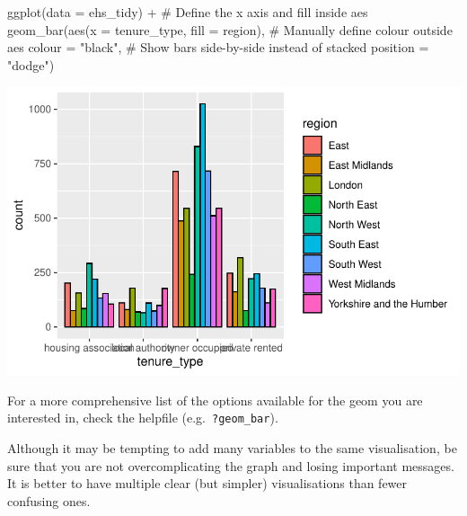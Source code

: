 \documentclass[
  letterpaper,
  DIV=11,
  numbers=noendperiod]{scrreprt}
\newenvironment{Shaded}{\begin{snugshade}}{\end{snugshade}}
\newcommand{\AttributeTok}[1]{\textcolor[rgb]{0.40,0.45,0.13}{#1}}
\newcommand{\CommentTok}[1]{\textcolor[rgb]{0.37,0.37,0.37}{#1}}
\newcommand{\FunctionTok}[1]{\textcolor[rgb]{0.28,0.35,0.67}{#1}}
\newcommand{\NormalTok}[1]{\textcolor[rgb]{0.00,0.23,0.31}{#1}}
\newcommand{\SpecialCharTok}[1]{\textcolor[rgb]{0.37,0.37,0.37}{#1}}
\newcommand{\StringTok}[1]{\textcolor[rgb]{0.13,0.47,0.30}{#1}}
\begin{document}
\begin{Shaded}
\begin{Highlighting}[]
\FunctionTok{ggplot}\NormalTok{(}\AttributeTok{data =}\NormalTok{ ehs\_tidy) }\SpecialCharTok{+} 
  \CommentTok{\# Define the x axis and fill inside aes}
  \FunctionTok{geom\_bar}\NormalTok{(}\FunctionTok{aes}\NormalTok{(}\AttributeTok{x =}\NormalTok{ tenure\_type, }\AttributeTok{fill =}\NormalTok{ region),}
           \CommentTok{\# Manually define colour outside aes}
           \AttributeTok{colour =} \StringTok{"black"}\NormalTok{,}
           \CommentTok{\# Show bars side{-}by{-}side instead of stacked}
           \AttributeTok{position =} \StringTok{"dodge"}\NormalTok{)}
\end{Highlighting}
\end{Shaded}

\includegraphics{visualisation_files/figure-pdf/side-by-side bar chart tenure-1.pdf}

For a more comprehensive list of the options available for the geom you
are interested in, check the helpfile (e.g.~\texttt{?geom\_bar}).

\begin{tcolorbox}[enhanced jigsaw, bottomrule=.15mm, left=2mm, leftrule=.75mm, bottomtitle=1mm, coltitle=black, colbacktitle=quarto-callout-warning-color!10!white, toptitle=1mm, arc=.35mm, breakable, title=\textcolor{quarto-callout-warning-color}{\faExclamationTriangle}\hspace{0.5em}{Warning}, rightrule=.15mm, toprule=.15mm, opacityback=0, opacitybacktitle=0.6, titlerule=0mm, colback=white, colframe=quarto-callout-warning-color-frame]

Although it may be tempting to add many variables to the same
visualisation, be sure that you are not overcomplicating the graph and
losing important messages. It is better to have multiple clear (but
simpler) visualisations than fewer confusing ones.

\end{tcolorbox}
\end{document}
